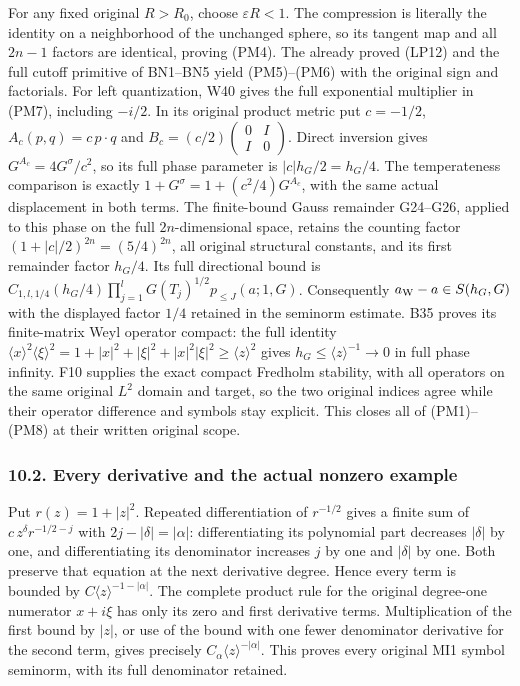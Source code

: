 \documentclass[
  11pt,
]{article}
\begin{document}
For any fixed original \(R>R_0\), choose \(\varepsilon R<1\). The
compression is literally the identity on a neighborhood of the unchanged
sphere, so its tangent map and all \(2n-1\) factors are identical,
proving (PM4). The already proved (LP12) and the full cutoff primitive
of BN1--BN5 yield (PM5)--(PM6) with the original sign and factorials.
For left quantization, W40 gives the full exponential multiplier in
(PM7), including \(-i/2\). In its original product metric put
\(c=-1/2\), \(A_c(p,q)=c\,p\cdot q\) and
\(B_c=(c/2)\left(\begin{smallmatrix}0&I\\I&0\end{smallmatrix}\right)\).
Direct inversion gives \(G^{A_c}=4G^\sigma/c^2\), so its full phase
parameter is \(|c|h_G/2=h_G/4\). The temperateness comparison is exactly
\(1+G^\sigma=1+(c^2/4)G^{A_c}\), with the same actual displacement in
both terms. The finite-bound Gauss remainder G24--G26, applied to this
phase on the full \(2n\)-dimensional space, retains the counting factor
\((1+|c|/2)^{2n}=(5/4)^{2n}\), all original structural constants, and
its first remainder factor \(h_G/4\). Its full directional bound is
\(C_{1,l,1/4}(h_G/4)\prod_{j=1}^lG(T_j)^{1/2}p_{\le J}(a;1,G)\).
Consequently \(a_{\rm W}-a\in S(h_G,G)\) with the displayed factor
\(1/4\) retained in the seminorm estimate. B35 proves its finite-matrix
Weyl operator compact: the full identity
\(\langle x\rangle^2\langle\xi\rangle^2=1+|x|^2+|\xi|^2+|x|^2|\xi|^2\ge\langle z\rangle^2\)
gives \(h_G\le\langle z\rangle^{-1}\to0\) in full phase infinity. F10
supplies the exact compact Fredholm stability, with all operators on the
same original \(L^2\) domain and target, so the two original indices
agree while their operator difference and symbols stay explicit. This
closes all of (PM1)--(PM8) at their written original scope.

\subsubsection{10.2. Every derivative and the actual nonzero
example}\label{every-derivative-and-the-actual-nonzero-example}

Put \(r(z)=1+|z|^2\). Repeated differentiation of \(r^{-1/2}\) gives a
finite sum of \(c\,z^\delta r^{-1/2-j}\) with \(2j-|\delta|=|\alpha|\):
differentiating its polynomial part decreases \(|\delta|\) by one, and
differentiating its denominator increases \(j\) by one and \(|\delta|\)
by one. Both preserve that equation at the next derivative degree. Hence
every term is bounded by \(C\langle z\rangle^{-1-|\alpha|}\). The
complete product rule for the original degree-one numerator \(x+i\xi\)
has only its zero and first derivative terms. Multiplication of the
first bound by \(|z|\), or use of the bound with one fewer denominator
derivative for the second term, gives precisely
\(C_\alpha\langle z\rangle^{-|\alpha|}\). This proves every original MI1
symbol seminorm, with its full denominator retained.
\end{document}
